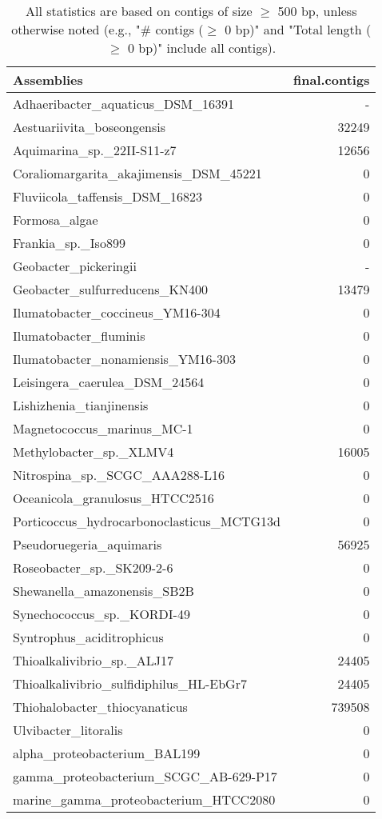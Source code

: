 \documentclass[12pt,a4paper]{article}
\begin{document}
\begin{table}[ht]
\begin{center}
\caption{All statistics are based on contigs of size $\geq$ 500 bp, unless otherwise noted (e.g., "\# contigs ($\geq$ 0 bp)" and "Total length ($\geq$ 0 bp)" include all contigs).}
\begin{tabular}{|l*{1}{|r}|}
\hline
Assemblies & final.contigs \\ \hline
Adhaeribacter\_aquaticus\_DSM\_16391 & - \\ \hline
Aestuariivita\_boseongensis & 32249 \\ \hline
Aquimarina\_sp.\_22II-S11-z7 & 12656 \\ \hline
Coraliomargarita\_akajimensis\_DSM\_45221 & 0 \\ \hline
Fluviicola\_taffensis\_DSM\_16823 & 0 \\ \hline
Formosa\_algae & 0 \\ \hline
Frankia\_sp.\_Iso899 & 0 \\ \hline
Geobacter\_pickeringii & - \\ \hline
Geobacter\_sulfurreducens\_KN400 & 13479 \\ \hline
Ilumatobacter\_coccineus\_YM16-304 & 0 \\ \hline
Ilumatobacter\_fluminis & 0 \\ \hline
Ilumatobacter\_nonamiensis\_YM16-303 & 0 \\ \hline
Leisingera\_caerulea\_DSM\_24564 & 0 \\ \hline
Lishizhenia\_tianjinensis & 0 \\ \hline
Magnetococcus\_marinus\_MC-1 & 0 \\ \hline
Methylobacter\_sp.\_XLMV4 & 16005 \\ \hline
Nitrospina\_sp.\_SCGC\_AAA288-L16 & 0 \\ \hline
Oceanicola\_granulosus\_HTCC2516 & 0 \\ \hline
Porticoccus\_hydrocarbonoclasticus\_MCTG13d & 0 \\ \hline
Pseudoruegeria\_aquimaris & 56925 \\ \hline
Roseobacter\_sp.\_SK209-2-6 & 0 \\ \hline
Shewanella\_amazonensis\_SB2B & 0 \\ \hline
Synechococcus\_sp.\_KORDI-49 & 0 \\ \hline
Syntrophus\_aciditrophicus & 0 \\ \hline
Thioalkalivibrio\_sp.\_ALJ17 & 24405 \\ \hline
Thioalkalivibrio\_sulfidiphilus\_HL-EbGr7 & 24405 \\ \hline
Thiohalobacter\_thiocyanaticus & 739508 \\ \hline
Ulvibacter\_litoralis & 0 \\ \hline
alpha\_proteobacterium\_BAL199 & 0 \\ \hline
gamma\_proteobacterium\_SCGC\_AB-629-P17 & 0 \\ \hline
marine\_gamma\_proteobacterium\_HTCC2080 & 0 \\ \hline
\end{tabular}
\end{center}
\end{table}
\end{document}

